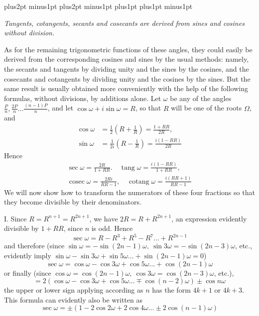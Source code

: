 \clearpage
\begingroup\abovedisplayskip=6pt plus2pt minus1pt \belowdisplayskip=6pt plus2pt minus1pt \abovedisplayshortskip=0pt plus1pt \belowdisplayshortskip=3pt plus1pt minus1pt
\begin{center}\itshape \textit{Tangents, cotangents, secants and cosecants are derived from sines and cosines without division.}\end{center}


As for the remaining trigonometric functions of these angles, they could easily be derived from the corresponding cosines and sines by the usual methods: namely, the secants and tangents by dividing unity and the sines by the cosines, and the cosecants and cotangents by dividing unity and the cosines by the sines. But the same result is usually obtained more conveniently with the help of the following formulas, without divisions, by additions alone. Let \(\omega\) be any of the angles \(\frac Pn,\allowbreak \frac{2P}n\ldots\frac{(n-1)P}n\), and let \(\cos\omega+i\sin\omega=R\), so that \(R\) will be one of the roots \(\Omega\), and \[\begin{aligned}\cos\omega&=\tfrac12(R+\tfrac1R)=\frac{1+RR}{2R},\\\sin\omega&=\tfrac1{2i}(R-\tfrac1R)=\frac{i(1-RR)}{2R}\end{aligned}\] Hence \[\begin{gathered}\sec\omega=\frac{2R}{1+RR}.\quad\operatorname{tang}\omega=\frac{i(1-RR)}{1+RR},\\\operatorname{cosec}\omega=\frac{2Ri}{RR-1},\quad\operatorname{cotang}\omega=\frac{i(RR+1)}{RR-1}\end{gathered}\] We will now show how to transform the numerators of these four fractions so that they become divisible by their denominators.

I. Since \(R=R^{n+1}=R^{2n+1}\), we have \(2R=R+R^{2n+1}\), an expression evidently divisible by \(1+RR\), since \(n\) is odd. Hence \[\sec\omega=R-R^3+R^5-R^7\ldots+R^{2n-1}\] and therefore (since \(\sin\omega=-\sin(2n-1)\omega,\allowbreak \ \sin3\omega=-\sin(2n-3)\omega\), etc., evidently imply \(\sin\omega-\sin3\omega+\sin5\omega\ldots+\sin(2n-1)\omega=0\)) \[\sec\omega=\cos\omega-\cos3\omega+\cos5\omega\ldots+\cos(2n-1)\omega\] or finally (since \(\cos\omega=\cos(2n-1)\omega,\allowbreak \ \cos3\omega=\cos(2n-3)\omega\), etc.), \[=2(\cos\omega-\cos3\omega+\cos5\omega\ldots\mp\cos(n-2)\omega)\pm\cos n\omega\] the upper or lower sign applying according as \(n\) has the form \(4k+1\) or \(4k+3\). This formula can evidently also be written as \[\sec\omega=\pm(1-2\cos2\omega+2\cos4\omega\ldots\pm2\cos(n-1)\omega)\]

